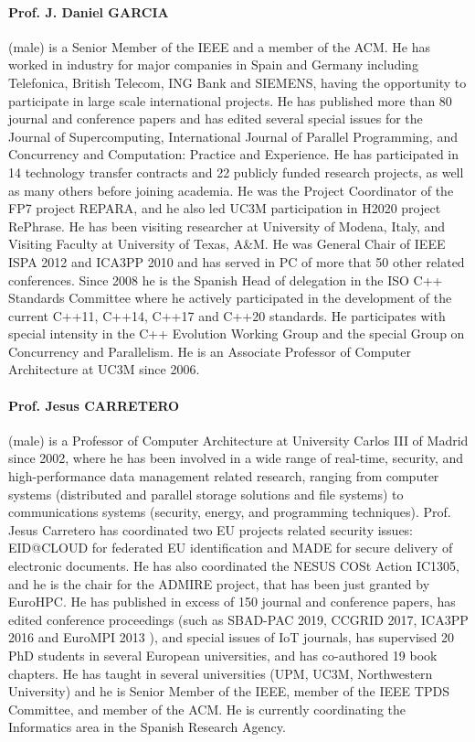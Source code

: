 \documentclass[a4paper,11pt]{article}
\begin{document}
\paragraph{Prof. J. Daniel GARCIA} (male) is a Senior Member of the IEEE and a member of the ACM. He has worked in industry for major companies in Spain and Germany including Telefonica, British Telecom, ING Bank and SIEMENS, having the opportunity to participate in large scale international projects.
He has published more than 80 journal and conference papers and has edited several special issues for the Journal of Supercomputing, International Journal of Parallel Programming, and Concurrency and Computation: Practice and Experience. He has participated in 14 technology transfer contracts and 22 publicly funded research projects, as well as many others before joining academia. He was the Project Coordinator of the FP7 project REPARA, and he also led UC3M participation in H2020 project RePhrase.
He has been visiting researcher at University of Modena, Italy, and Visiting Faculty at University of
Texas, A\&M. He was General Chair of IEEE ISPA 2012 and ICA3PP 2010 and has served in PC of
more that 50 other related conferences. Since 2008 he is the Spanish Head of delegation in the ISO
C++ Standards Committee where he actively participated in the development of the current C++11, C++14, C++17 and C++20 standards. He participates with special intensity in the C++ Evolution Working Group and the special Group on Concurrency and Parallelism. He is an
Associate Professor of Computer Architecture at UC3M since 2006.

\paragraph{Prof. Jesus CARRETERO} (male) is a Professor of Computer Architecture at University Carlos III of Madrid since 2002, where he has been involved in a wide range of real-time, security, and high-performance data management related research, ranging from computer systems (distributed and parallel storage solutions and file systems) to communications systems (security, energy, and programming techniques). Prof. Jesus Carretero has coordinated two EU projects related security issues: EID@CLOUD for federated EU identification and MADE for secure delivery of electronic documents.  He has also coordinated the NESUS COSt Action IC1305, and he is the chair for the ADMIRE project, that has been just granted by EuroHPC. He has published in excess of 150 journal and conference papers, has edited conference proceedings (such as SBAD-PAC 2019, CCGRID 2017, ICA3PP 2016 and EuroMPI 2013 ), and special issues of IoT journals, has supervised 20 PhD students in several European universities, and has co-authored 19 book chapters. He has taught in several universities (UPM, UC3M, Northwestern University) and he is Senior Member of the IEEE, member of the IEEE TPDS Committee, and member of the ACM. He is currently coordinating the Informatics area in the Spanish Research Agency. 
\end{document}
